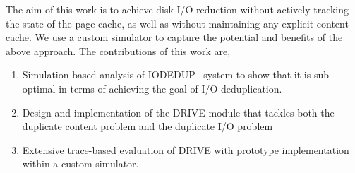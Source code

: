 The aim of this work is to achieve disk I/O reduction without actively 
tracking the state of the page-cache, as well as without maintaining any 
explicit content cache. 
We use a custom simulator to capture
the potential and benefits of the above approach.
The contributions of this work are, 
\begin{enumerate}
\item Simulation-based analysis of IODEDUP~\cite{iodedup} 
	system to show that it is
      sub-optimal in terms of achieving the goal of I/O deduplication.
  \item Design and implementation of the DRIVE 
	  module that tackles both the
	duplicate content problem and the duplicate I/O problem
\item Extensive trace-based evaluation of DRIVE with prototype
implementation within a custom simulator.
\end{enumerate}



